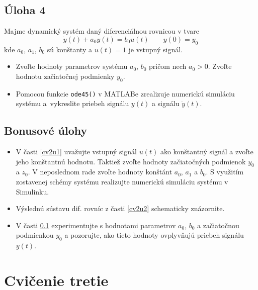 \documentclass[a4paper, 10pt, ]{article}
\begin{document}
\subsection{Úloha 4} \label{cv2u4}

Majme dynamický systém daný diferenciálnou rovnicou v tvare
\begin{equation} \label{eq:DR1R}
     \dot y(t) + a_0 y(t) = b_0 u(t) \qquad y(0) = y_0 
\end{equation}
kde $a_0$, $a_1$, $b_0$ sú konštanty a $u(t) = 1$ je vstupný signál.

\begin{itemize}[leftmargin=0pt, labelsep=3mm, itemsep=0pt]
    \item Zvoľte hodnoty parametrov systému $a_0$, $b_0$ pričom nech $a_0 > 0$. Zvoľte hodnotu začiatočnej podmienky $y_0$.
    \item Pomocou funkcie \lstinline|ode45()| v MATLABe zrealizuje numerickú simuláciu systému a~vykreslite priebeh signálu $y(t)$ a signálu $\dot y(t)$.

\end{itemize}




\subsection{Bonusové úlohy}

\begin{itemize}[leftmargin=0pt, labelsep=3mm, itemsep=0pt]
    \item V časti \ref{cv2u1} uvažujte vstupný signál $u(t)$ ako konštantný signál a zvoľte jeho konštantnú hodnotu. Taktiež zvoľte hodnoty začiatočných podmienok $y_0$ a $z_0$. V neposlednom rade zvoľte hodnoty konštánt $a_0$, $a_1$ a $b_0$. S využitím zostavenej schémy systému realizujte numerickú simuláciu systému v Simulinku.
    \item Výslednú sústavu dif. rovníc z časti \ref{cv2u2} schematicky znázornite.
    \item V časti \ref{cv2u4} experimentujte s hodnotami parametrov $a_0$, $b_0$ a začiatočnou podmienkou $y_0$ a pozorujte, ako tieto hodnoty ovplyvňujú priebeh signálu $y(t)$.
\end{itemize}








\section{Cvičenie tretie} 
\end{document}
